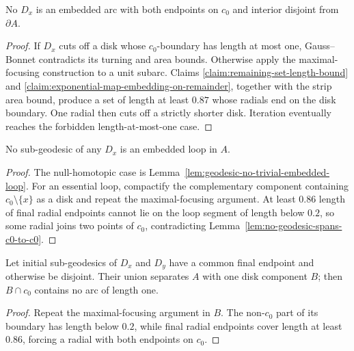 \begin{lemma}
\label{lem:no-geodesic-spans-c0-to-c0}
\label{Dxacross}
No $D_x$ is an embedded arc with both endpoints on $c_0$ and interior disjoint
from $\partial A$.
\end{lemma}
\begin{proof}
\sketch If $D_x$ cuts off a disk whose $c_0$-boundary has length at most one,
Gauss--Bonnet contradicts its turning and area bounds. Otherwise apply the
maximal-focusing construction to a unit subarc. Claims
\ref{claim:remaining-set-length-bound} and
\ref{claim:exponential-map-embedding-on-remainder}, together with the strip
area bound, produce a set of length at least $0.87$ whose radials end on the
disk boundary. One radial then cuts off a strictly shorter disk. Iteration
eventually reaches the forbidden length-at-most-one case.
\end{proof}

\begin{lemma}
\label{lem:geodesic-no-embedded-loop-general}
No sub-geodesic of any $D_x$ is an embedded loop in $A$.
\end{lemma}
\begin{proof}
\sketch The null-homotopic case is
Lemma~\ref{lem:geodesic-no-trivial-embedded-loop}. For an essential loop,
compactify the complementary component containing $c_0\setminus\{x\}$ as a
disk and repeat the maximal-focusing argument. At least $0.86$ length of final
radial endpoints cannot lie on the loop segment of length below $0.2$, so some
radial joins two points of $c_0$, contradicting
Lemma~\ref{lem:no-geodesic-spans-c0-to-c0}.
\end{proof}

\begin{lemma}
\label{lem:far-apart-geodesics-disjoint}
Let initial sub-geodesics of $D_x$ and $D_y$ have a common final endpoint and
otherwise be disjoint. Their union separates $A$ with one disk component $B$;
then $B\cap c_0$ contains no arc of length one.
\end{lemma}
\begin{proof}
\sketch Repeat the maximal-focusing argument in $B$. The non-$c_0$ part of its boundary
has length below $0.2$, while final radial endpoints cover length at least
$0.86$, forcing a radial with both endpoints on $c_0$.
\end{proof}

